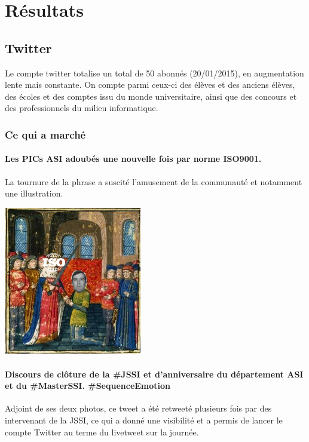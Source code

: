 \section{Résultats}

\subsection{Twitter}

Le compte twitter totalise un total de 50 abonnés (20/01/2015), en augmentation lente mais constante. On compte parmi ceux-ci des élèves et des anciens élèves, des écoles et des comptes issu du monde universitaire, ainsi que des concours et des professionnels du milieu informatique.


\subsubsection{Ce qui a marché}
\paragraph{Les PICs ASI adoubés une nouvelle fois par norme ISO9001.}
La tournure de la phrase a suscité l'amusement de la communauté et notamment une illustration.
\begin{center}
\includegraphics[width=0.45\textwidth]{images/adoubement.png}
\end{center}

\paragraph{Discours de clôture de la \#JSSI et d'anniversaire du département ASI et du \#MasterSSI. \#SequenceEmotion }
Adjoint de ses deux photos, ce tweet a été retweeté plusieurs fois par des intervenant de la JSSI, ce qui a donné une visibilité et a permis de lancer le compte Twitter au terme du livetweet sur la journée.

